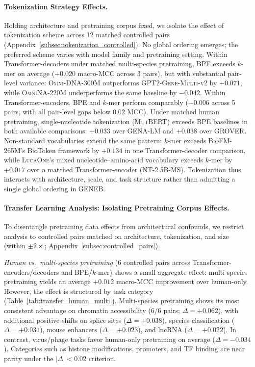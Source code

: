 \documentclass{llmxive}
\begin{document}
\paragraph{Tokenization Strategy Effects.}
Holding architecture and pretraining corpus fixed, we isolate the
effect of tokenization scheme across 12 matched controlled pairs
(Appendix~\ref{subsec:tokenization_controlled}). No global ordering
emerges; the preferred scheme varies with model family and
pretraining setting. Within Transformer-decoders under matched
multi-species pretraining, BPE exceeds $k$-mer on average ($+0.020$
macro-MCC across 3 pairs), but with substantial pair-level variance:
\textsc{Omni-DNA-300M} outperforms \textsc{GPT2-Gene-Multi-v2} by
$+0.071$, while \textsc{OmniNA-220M} underperforms the same baseline
by $-0.042$. Within Transformer-encoders, BPE and $k$-mer perform comparably
($+0.006$ across 5 pairs, with all pair-level gaps below $0.02$ MCC). Under matched human pretraining,
single-nucleotide tokenization (\textsc{MutBERT}) exceeds BPE baselines in both available comparisons: $+0.033$ over \textsc{GENA-LM} and
$+0.038$ over \textsc{GROVER}. Non-standard vocabularies extend
the same pattern: $k$-mer exceeds \textsc{BioFM-265M}'s BioToken
framework by $+0.134$ in one Transformer-decoder comparison, while
\textsc{LucaOne}'s mixed nucleotide--amino-acid vocabulary exceeds
$k$-mer by $+0.017$ over a matched Transformer-encoder
(\textsc{NT-2.5B-MS}).
Tokenization thus interacts with architecture, scale, and task
structure rather than admitting a single global ordering in GENEB.

\paragraph{Transfer Learning Analysis: Isolating Pretraining Corpus Effects.}
To disentangle pretraining data effects from architectural confounds,
we restrict analysis to controlled pairs matched on architecture,
tokenization, and size (within $\pm 2\times$;
Appendix~\ref{subsec:controlled_pairs}).

\textit{Human vs.\ multi-species pretraining} (6 controlled pairs
across Transformer-encoders/decoders and BPE/$k$-mer) shows a small
aggregate effect: multi-species pretraining yields an average
$+0.012$ macro-MCC improvement over human-only. However, the effect
is structured by task category
(Table~\ref{tab:transfer_human_multi}). Multi-species pretraining
shows its most consistent advantage on chromatin accessibility
(6/6 pairs; $\Delta=+0.062$), with additional positive shifts on
splice sites ($\Delta=+0.038$), species classification
($\Delta=+0.031$), mouse enhancers ($\Delta=+0.023$), and lncRNA
($\Delta=+0.022$). In contrast, virus/phage tasks favor human-only
pretraining on average ($\Delta=-0.034$). Categories such as histone
modifications, promoters, and TF binding are near parity under the
$|\Delta|<0.02$ criterion.
\end{document}
